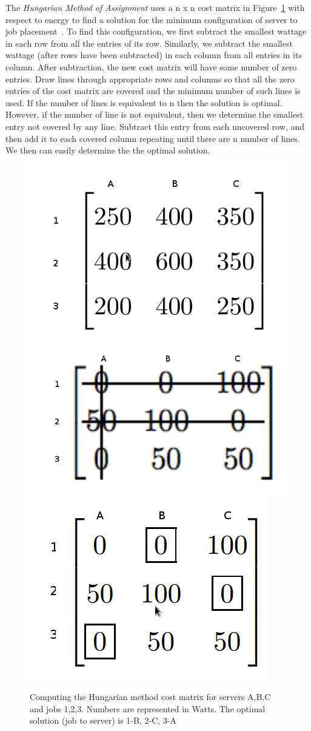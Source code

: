 \documentclass{sig-alternate}
\begin{document}
The \emph{Hungarian Method of Assignment} uses a n x n cost matrix in Figure~\ref{fig:HMA} with respect to energy to find a solution for the minimum configuration of server to job placement~\cite{Han}. To find this configuration, we first subtract the smallest wattage in each row from all the entries of its row. Similarly, we subtract the smallest wattage (after rows have been subtracted) in each column from all entries in its column. After subtraction, the new cost matrix will have some number of zero entries. Draw lines through appropriate rows and columns so that all the zero entries of the cost matrix are covered and the minimum number of such lines is used.  If the number of lines is equivalent to n then the solution is optimal. However, if the number of line is not equivalent, then we determine the smallest entry not covered by any line. Subtract this entry from each uncovered row, and then add it to each covered column repeating until there are n number of lines.  We then can easily determine the the optimal solution.

\begin{figure}[tb]
 \centering
 \includegraphics[height=0.25 \textwidth]{s}
 \includegraphics[height=0.20 \textwidth]{s2}
 \includegraphics[height=0.25 \textwidth]{s3}
 \caption{Computing the Hungarian method cost matrix for servers A,B,C and jobs 1,2,3. Numbers are represented in Watts. The optimal solution (job to server) is 1-B, 2-C, 3-A}
 \label{fig:HMA}
\end{figure}
\end{document}
